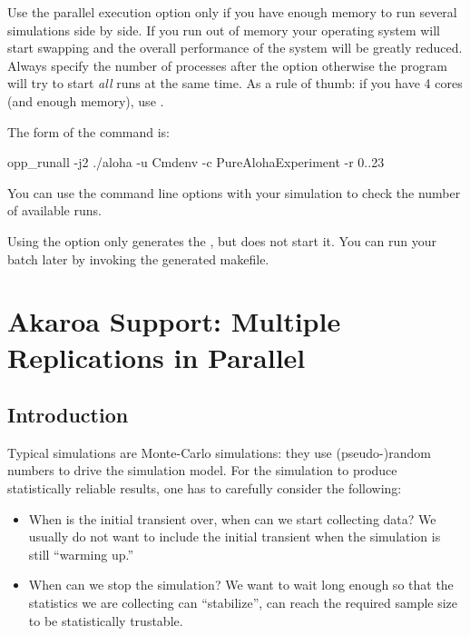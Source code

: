 \begin{warning}
  Use the parallel execution option only if you have enough memory to run several simulations
  side by side. If you run out of memory your operating system will start swapping and the overall
  performance of the system will be greatly reduced. Always specify the number of processes
  after the  option otherwise the  program will try to start \textit{all}
  runs at the same time. As a rule of thumb: if you have 4 cores (and enough memory), use .
\end{warning}

The form of the command is:
\begin{commandline}
opp_runall -j2 ./aloha -u Cmdenv -c PureAlohaExperiment -r 0..23
\end{commandline}

You can use the  command line options with your simulation to
check the number of available runs.

Using the  option only generates the , but does not start it.
You can run your batch later by invoking the generated makefile.



\section{Akaroa Support: Multiple Replications in Parallel}
\label{sec:ch-run-sim:akaroa}

\subsection{Introduction}

Typical simulations are Monte-Carlo simulations: they use
(pseudo-)random numbers to drive the simulation model.
For the simulation to produce statistically reliable results,
one has to carefully consider the following:

\begin{itemize}
  \item{When is the initial transient over, when can we start
    collecting data? We usually do not want to include the
    initial transient when the simulation is still ``warming up.''}
  \item{When can we stop the simulation? We want to wait long enough
    so that the statistics we are collecting can ``stabilize'',
    can reach the required sample size to be statistically trustable.}
\end{itemize}


